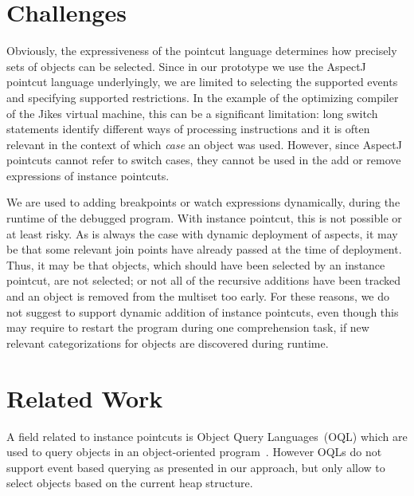 \documentclass{sig-alternate}
\begin{document}
\section{Challenges}
\label{sec:challenges}

Obviously, the expressiveness of the pointcut language determines how precisely sets of objects can be selected.
Since in our prototype we use the AspectJ pointcut language underlyingly, we are limited to selecting the supported events and specifying supported restrictions.
In the example of the optimizing compiler of the Jikes virtual machine, this can be a significant limitation:
long switch statements identify different ways of processing instructions and it is often relevant in the context of which \emph{case} an object was used.
However, since AspectJ pointcuts cannot refer to switch cases, they cannot be used in the add or remove expressions of instance pointcuts.


We are used to adding breakpoints or watch expressions dynamically, during the runtime of the debugged program.
With instance pointcut, this is not possible or at least risky.
As is always the case with dynamic deployment of aspects, it may be that some relevant join points have already passed at the time of deployment.
Thus, it may be that objects, which should have been selected by an instance pointcut, are not selected; or not all of the recursive additions have been tracked and an object is removed from the multiset too early.
For these reasons, we do not suggest to support dynamic addition of instance pointcuts, even though this may require to restart the program during one comprehension task, if new relevant categorizations for objects are discovered during runtime.

\section{Related Work}
\label{sec:related-work}

A field related to instance pointcuts is Object Query Languages~(OQL) which are used to query objects in an object-oriented program~\cite{cluet1998designing}.
However OQLs do not support event based querying as presented in our approach, but only allow to select objects based on the current heap structure.
\end{document}
